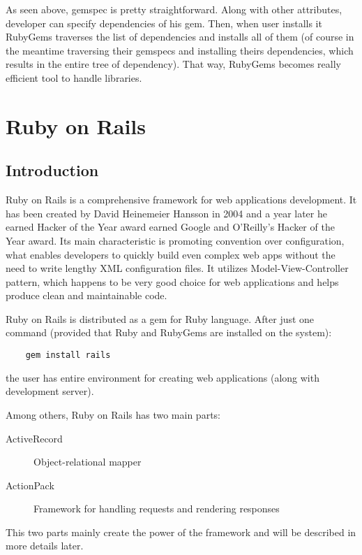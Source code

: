   
  
  As seen above, gemspec is pretty straightforward. Along with other attributes, developer can specify dependencies of his gem. Then, when user installs it RubyGems traverses the list of dependencies and installs all of them (of course in the meantime traversing their gemspecs and installing theirs dependencies, which results in the entire tree of dependency). That way, RubyGems becomes really efficient tool to handle libraries. 
  
  \section{Ruby on Rails}
    \subsection{Introduction}
  Ruby on Rails is a comprehensive framework for web applications development. It has been created by David Heinemeier Hansson in 2004 and a year later he earned Hacker of the Year award  earned Google and O'Reilly's Hacker of the Year award. Its main characteristic is promoting convention over configuration, what enables developers to quickly build even complex web apps without the need to write lengthy XML configuration files. It utilizes Model-View-Controller pattern, which happens to be very good choice for web applications and helps produce clean and maintainable code.
  
  Ruby on Rails is distributed as a gem for Ruby language. After just one command (provided that Ruby and RubyGems are installed on the system):
  
  \begin{lstlisting}
    gem install rails
  \end{lstlisting}
  
  the user has entire environment for creating web applications (along with development server).
  
  Among others, Ruby on Rails has two main parts:
  \begin{description}
    \item[ActiveRecord] Object-relational mapper
    \item[ActionPack] Framework for handling requests and rendering responses
  \end{description}
  
  This two parts mainly create the power of the framework and will be described in more details later.
  
